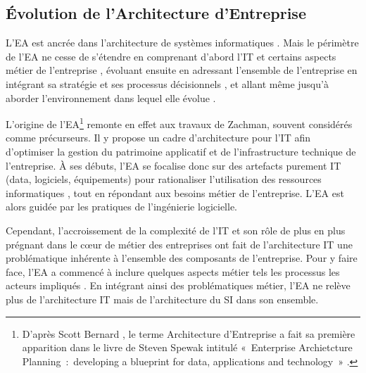 
\subsection{Évolution de l'Architecture d'Entreprise}

L'EA est ancrée dans l'architecture de systèmes informatiques
\cite{kappelman2008enterprise}. Mais le périmètre de l'EA ne cesse de s'étendre
en comprenant d'abord l'IT et certains aspects métier de l'entreprise
\cite{winter2006essential}, évoluant ensuite en adressant l'ensemble de
l'entreprise en intégrant sa stratégie et ses processus décisionnels
\cite{ross2006enterprise}, et allant même jusqu'à aborder l'environnement dans
lequel elle évolue \cite{lapalme2012three}.

L'origine de l'EA\footnote{D'après Scott Bernard
\cite{bernard2012introduction}, le terme Architecture d'Entreprise a fait sa
première apparition dans le livre de Steven Spewak intitulé «~Enterprise
Archietcture Planning~:~developing a blueprint for data, applications and
technology~» \cite{spewak1993enterprise}.} remonte en effet aux travaux de
Zachman, souvent considérés comme précurseurs.  Il y propose un cadre
d'architecture pour l'IT \cite{zachman1987framework} afin d'optimiser la
gestion du patrimoine applicatif et de l'infrastructure technique de
l'entreprise. À ses débuts, l'EA se focalise donc sur des artefacts purement IT
(data, logiciels, équipements) pour rationaliser l'utilisation des ressources
informatiques \cite{winter2006essential}, tout en répondant aux besoins métier
de l'entreprise. L'EA est alors guidée par les pratiques de l'ingénierie
logicielle. 

Cependant, l'accroissement de la complexité de l'IT et son rôle de plus en plus
prégnant dans le cœur de métier des entreprises
\cite{ranganathan2005enterprise} ont fait de l'architecture IT une
problématique inhérente à l'ensemble des composants de l'entreprise. Pour y
faire face, l'EA a commencé à inclure quelques aspects métier tels les
processus les acteurs impliqués \cite{winter2006essential}. En intégrant ainsi
des problématiques métier, l'EA ne relève plus de l'architecture IT mais de
l'architecture du SI dans son ensemble.

